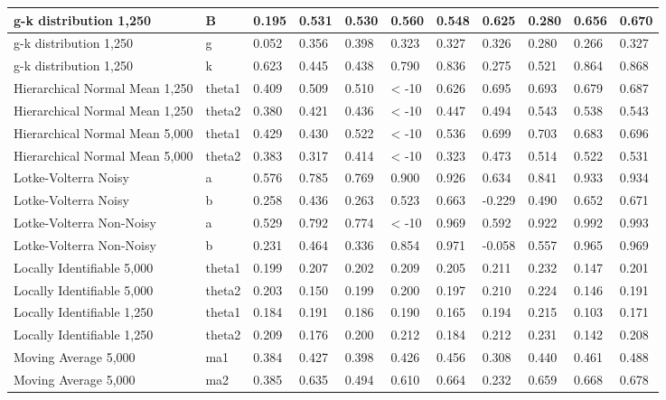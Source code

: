 \documentclass[]{article}
\begin{document}
\begin{tabular}{l|l|l|l|l|l|l|l|l|l|l}
\hline
g-k distribution 1,250 & B & 0.195 & 0.531 & 0.530 & 0.560 & 0.548 & 0.625 & 0.280 & 0.656 & 0.670\\
\hline
g-k distribution 1,250 & g & 0.052 & 0.356 & 0.398 & 0.323 & 0.327 & 0.326 & 0.280 & 0.266 & 0.327\\
\hline
g-k distribution 1,250 & k & 0.623 & 0.445 & 0.438 & 0.790 & 0.836 & 0.275 & 0.521 & 0.864 & 0.868\\
\hline
Hierarchical Normal Mean 1,250 & theta1 & 0.409 & 0.509 & 0.510 & < -10 & 0.626 & 0.695 & 0.693 & 0.679 & 0.687\\
\hline
Hierarchical Normal Mean 1,250 & theta2 & 0.380 & 0.421 & 0.436 & < -10 & 0.447 & 0.494 & 0.543 & 0.538 & 0.543\\
\hline
Hierarchical Normal Mean 5,000 & theta1 & 0.429 & 0.430 & 0.522 & < -10 & 0.536 & 0.699 & 0.703 & 0.683 & 0.696\\
\hline
Hierarchical Normal Mean 5,000 & theta2 & 0.383 & 0.317 & 0.414 & < -10 & 0.323 & 0.473 & 0.514 & 0.522 & 0.531\\
\hline
Lotke-Volterra Noisy & a & 0.576 & 0.785 & 0.769 & 0.900 & 0.926 & 0.634 & 0.841 & 0.933 & 0.934\\
\hline
Lotke-Volterra Noisy & b & 0.258 & 0.436 & 0.263 & 0.523 & 0.663 & -0.229 & 0.490 & 0.652 & 0.671\\
\hline
Lotke-Volterra Non-Noisy & a & 0.529 & 0.792 & 0.774 & < -10 & 0.969 & 0.592 & 0.922 & 0.992 & 0.993\\
\hline
Lotke-Volterra Non-Noisy & b & 0.231 & 0.464 & 0.336 & 0.854 & 0.971 & -0.058 & 0.557 & 0.965 & 0.969\\
\hline
Locally Identifiable 5,000 & theta1 & 0.199 & 0.207 & 0.202 & 0.209 & 0.205 & 0.211 & 0.232 & 0.147 & 0.201\\
\hline
Locally Identifiable 5,000 & theta2 & 0.203 & 0.150 & 0.199 & 0.200 & 0.197 & 0.210 & 0.224 & 0.146 & 0.191\\
\hline
Locally Identifiable 1,250 & theta1 & 0.184 & 0.191 & 0.186 & 0.190 & 0.165 & 0.194 & 0.215 & 0.103 & 0.171\\
\hline
Locally Identifiable 1,250 & theta2 & 0.209 & 0.176 & 0.200 & 0.212 & 0.184 & 0.212 & 0.231 & 0.142 & 0.208\\
\hline
Moving Average 5,000 & ma1 & 0.384 & 0.427 & 0.398 & 0.426 & 0.456 & 0.308 & 0.440 & 0.461 & 0.488\\
\hline
Moving Average 5,000 & ma2 & 0.385 & 0.635 & 0.494 & 0.610 & 0.664 & 0.232 & 0.659 & 0.668 & 0.678\\

\end{tabular}
\end{document}
